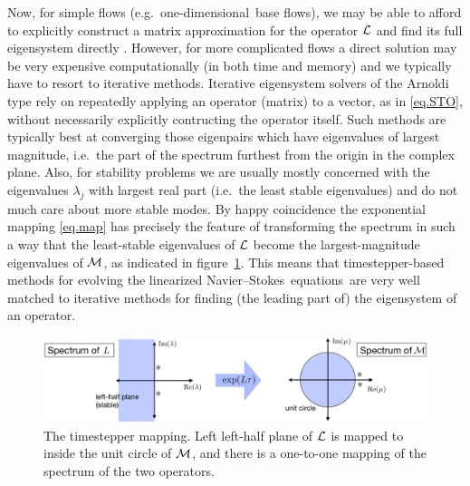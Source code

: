 \documentclass[11pt,a4paper]{report}
\newcommand\NavSto{Navier--Stokes}
\newcommand\LNS{linearized \NavSto}
\newcommand\LNSE{\LNS\ equations}
\newcommand\oned{one-di\-men\-sion\-al}
\newcommand{\ie}{i.e.\ }
\newcommand{\eg}{e.g.\ }
\newcommand\Lop{{\cal L}}
\newcommand\Mop{{\cal M}}
\begin{document}
Now, for simple flows (\eg \oned\ base flows), we may be able to
afford to explicitly construct a matrix approximation for the operator
$\Lop$ and find its full eigensystem directly \citep[see \eg appendix
  A of][]{schmid01}. However, for more complicated flows a direct
solution may be very expensive computationally (in both time and
memory) and we typically have to resort to iterative methods.
Iterative eigensystem solvers of the Arnoldi type \citep{saad92} rely
on repeatedly applying an operator (matrix) to a vector, as in
\eqref{eq.STO}, without necessarily explicitly contructing the
operator itself. Such methods are typically best at converging those
eigenpairs which have eigenvalues of largest magnitude, \ie the part
of the spectrum furthest from the origin in the complex plane.  Also,
for stability problems we are usually mostly concerned with the
eigenvalues $\lambda_j$ with largest real part (\ie the least stable
eigenvalues) and do not much care about more stable modes. By happy
coincidence the exponential mapping \eqref{eq.map} has precisely the
feature of transforming the spectrum in such a way that the
least-stable eigenvalues of $\Lop$ become the largest-magnitude
eigenvalues of $\Mop$, as indicated in figure~\ref{fig.map}.  This
means that timestepper-based methods for evolving the \LNSE\ are very
well matched to iterative methods for finding (the leading part of)
the eigensystem of an operator.

\begin{figure}
\begin{center}
\includegraphics[width=\textwidth]{mapping}
\end{center}
\caption{The timestepper mapping. Left left-half plane of $\Lop$ is
  mapped to inside the unit circle of $\Mop$, and there is a
  one-to-one mapping of the spectrum of the two operators.}
\label{fig.map}
\end{figure}
\end{document}
